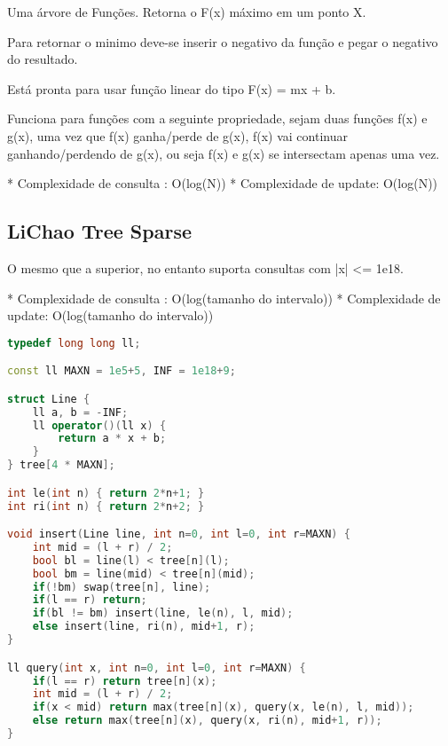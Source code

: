 \documentclass[11pt, a4paper, twoside]{article}
\begin{document}
Uma árvore de Funções. Retorna o F(x) máximo em um ponto X.

Para retornar o minimo deve-se inserir o negativo da função e pegar o negativo do resultado.

Está pronta para usar função linear do tipo F(x) = mx + b.

Funciona para funções com a seguinte propriedade, sejam duas funções f(x) e g(x), uma vez que f(x) ganha/perde de g(x), f(x) vai continuar ganhando/perdendo de g(x),
ou seja f(x) e g(x) se intersectam apenas uma vez.

* Complexidade de consulta : O(log(N))
* Complexidade de update: O(log(N))

\subsection{LiChao Tree Sparse}


O mesmo que a superior, no entanto suporta consultas com |x| <= 1e18.

* Complexidade de consulta : O(log(tamanho do intervalo))
* Complexidade de update: O(log(tamanho do intervalo))

\begin{lstlisting}[language=C++]
typedef long long ll;

const ll MAXN = 1e5+5, INF = 1e18+9;

struct Line {
    ll a, b = -INF;
    ll operator()(ll x) {
        return a * x + b;
    }
} tree[4 * MAXN];

int le(int n) { return 2*n+1; }
int ri(int n) { return 2*n+2; }

void insert(Line line, int n=0, int l=0, int r=MAXN) {
    int mid = (l + r) / 2;
    bool bl = line(l) < tree[n](l);
    bool bm = line(mid) < tree[n](mid);
    if(!bm) swap(tree[n], line);
    if(l == r) return;
    if(bl != bm) insert(line, le(n), l, mid);
    else insert(line, ri(n), mid+1, r);
}

ll query(int x, int n=0, int l=0, int r=MAXN) {
    if(l == r) return tree[n](x);
    int mid = (l + r) / 2;
    if(x < mid) return max(tree[n](x), query(x, le(n), l, mid));
    else return max(tree[n](x), query(x, ri(n), mid+1, r));
}
\end{lstlisting}
\end{document}
